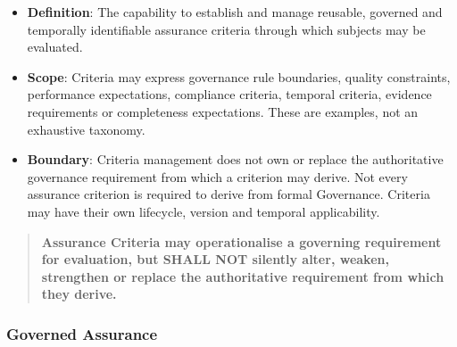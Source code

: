 \begin{itemize}

\item
\textbf{Definition}: The capability to establish and manage reusable, governed and temporally identifiable assurance criteria through which subjects may be evaluated.



\item
\textbf{Scope}: Criteria may express governance rule boundaries, quality constraints, performance expectations, compliance criteria, temporal criteria, evidence requirements or completeness expectations. These are examples, not an exhaustive taxonomy.



\item
\textbf{Boundary}: Criteria management does not own or replace the authoritative governance requirement from which a criterion may derive. Not every assurance criterion is required to derive from formal Governance. Criteria may have their own lifecycle, version and temporal applicability.



\end{itemize}
\label{rad:enabling:692}

\begin{quote}

\textbf{Assurance Criteria may operationalise a governing requirement for evaluation, but SHALL NOT silently alter, weaken, strengthen or replace the authoritative requirement from which they derive.}


\end{quote}
\label{rad:enabling:694}
\subsubsection*{Governed Assurance}
\label{rad:enabling:696}

